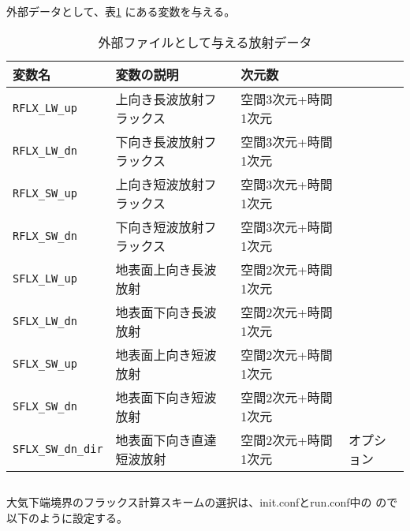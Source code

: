 \noindent
外部データとして、表\ref{tab:var_list_atm_rd_offline} にある変数を与える。
\begin{table}[h]
\begin{center}
  \caption{外部ファイルとして与える放射データ}
  \label{tab:var_list_atm_rd_offline}
  \begin{tabularx}{150mm}{lXll} \hline
    \rowcolor[gray]{0.9}  変数名 & 変数の説明 & 次元数 & \\ \hline
      \verb|RFLX_LW_up|     & 上向き長波放射フラックス & 空間3次元+時間1次元 \\
      \verb|RFLX_LW_dn|     & 下向き長波放射フラックス & 空間3次元+時間1次元 \\
      \verb|RFLX_SW_up|     & 上向き短波放射フラックス & 空間3次元+時間1次元 \\
      \verb|RFLX_SW_dn|     & 下向き短波放射フラックス & 空間3次元+時間1次元 \\
      \verb|SFLX_LW_up|     & 地表面上向き長波放射    & 空間2次元+時間1次元 \\
      \verb|SFLX_LW_dn|     & 地表面下向き長波放射    & 空間2次元+時間1次元 \\
      \verb|SFLX_SW_up|     & 地表面上向き短波放射    & 空間2次元+時間1次元 \\
      \verb|SFLX_SW_dn|     & 地表面下向き短波放射    & 空間2次元+時間1次元 \\
      \verb|SFLX_SW_dn_dir| & 地表面下向き直達短波放射 & 空間2次元+時間1次元 & オプション \\
    \hline
  \end{tabularx}
\end{center}
\end{table}




\subsection{\SubsecSurfaceSetting} \label{subsec:basic_usel_surface}
大気下端境界のフラックス計算スキームの選択は、init.confとrun.conf中の
ので以下のように設定する。\\

\\


